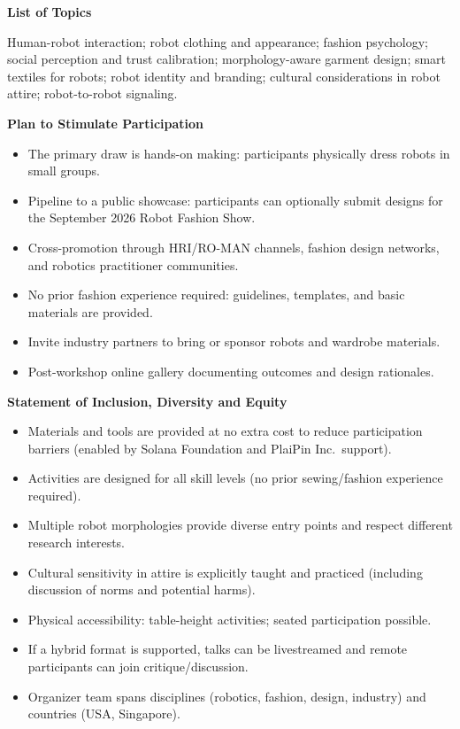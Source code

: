 \documentclass[12pt,letterpaper]{article}
\newcommand{\FormSection}[1]{\par\vspace{0.75\baselineskip}\noindent\textbf{#1}\par}
\begin{document}
\FormSection{List of Topics}
Human-robot interaction; robot clothing and appearance; fashion psychology; social perception and trust calibration; morphology-aware garment design; smart textiles for robots; robot identity and branding; cultural considerations in robot attire; robot-to-robot signaling.

\FormSection{Plan to Stimulate Participation}
\begin{itemize}
  \item The primary draw is hands-on making: participants physically dress robots in small groups.
  \item Pipeline to a public showcase: participants can optionally submit designs for the September 2026 Robot Fashion Show.
  \item Cross-promotion through HRI/RO-MAN channels, fashion design networks, and robotics practitioner communities.
  \item No prior fashion experience required: guidelines, templates, and basic materials are provided.
  \item Invite industry partners to bring or sponsor robots and wardrobe materials.
  \item Post-workshop online gallery documenting outcomes and design rationales.
\end{itemize}

\FormSection{Statement of Inclusion, Diversity and Equity}
\begin{itemize}
  \item Materials and tools are provided at no extra cost to reduce participation barriers (enabled by Solana Foundation and PlaiPin Inc.\ support).
  \item Activities are designed for all skill levels (no prior sewing/fashion experience required).
  \item Multiple robot morphologies provide diverse entry points and respect different research interests.
  \item Cultural sensitivity in attire is explicitly taught and practiced (including discussion of norms and potential harms).
  \item Physical accessibility: table-height activities; seated participation possible.
  \item If a hybrid format is supported, talks can be livestreamed and remote participants can join critique/discussion.
  \item Organizer team spans disciplines (robotics, fashion, design, industry) and countries (USA, Singapore).
\end{itemize}
\end{document}
